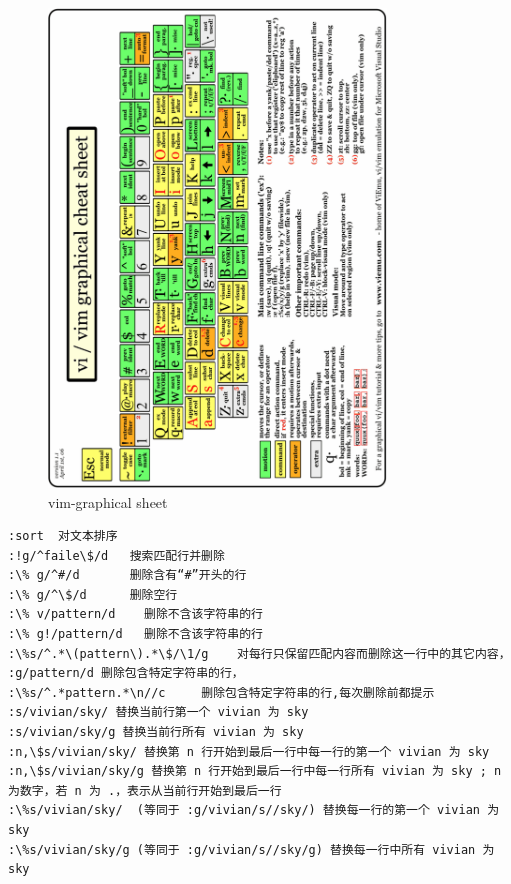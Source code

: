 \begin{figure}[!ht]
    \centering
    \includegraphics[width=0.8\textwidth]{vim/i3iyY.pdf}
    \caption{\label{Fig:vim-graphical sheet} vim-graphical sheet}
\end{figure}

\begin{lstlisting}
:sort  对文本排序 
:!g/^faile\$/d   搜索匹配行并删除
:\% g/^#/d       删除含有“#”开头的行 
:\% g/^\$/d      删除空行 
:\% v/pattern/d    删除不含该字符串的行 
:\% g!/pattern/d   删除不含该字符串的行 
:\%s/^.*\(pattern\).*\$/\1/g    对每行只保留匹配内容而删除这一行中的其它内容，
:g/pattern/d 删除包含特定字符串的行，
:\%s/^.*pattern.*\n//c     删除包含特定字符串的行,每次删除前都提示 
:s/vivian/sky/ 替换当前行第一个 vivian 为 sky 
:s/vivian/sky/g 替换当前行所有 vivian 为 sky 
:n,\$s/vivian/sky/ 替换第 n 行开始到最后一行中每一行的第一个 vivian 为 sky 
:n,\$s/vivian/sky/g 替换第 n 行开始到最后一行中每一行所有 vivian 为 sky ; n 为数字，若 n 为 .，表示从当前行开始到最后一行 
:\%s/vivian/sky/  (等同于 :g/vivian/s//sky/) 替换每一行的第一个 vivian 为 sky 
:\%s/vivian/sky/g (等同于 :g/vivian/s//sky/g) 替换每一行中所有 vivian 为 sky 
\end{lstlisting}

